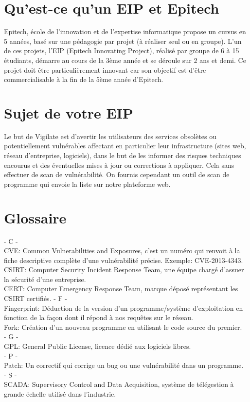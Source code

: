 \section{Qu'est-ce qu’un EIP et Epitech}
Epitech,  école de l'innovation et de l'expertise informatique propose un cursus en 5 années, basé sur une pédagogie par projet (à réaliser seul ou en groupe).  L'un de ces projets, l’EIP (Epitech Innovating Project), réalisé par groupe de 6 à 15 étudiants, démarre au cours de la 3ème année et se déroule sur 2 ans et demi. Ce  projet doit être particulièrement innovant car son objectif est d’être commercialisable à la fin de la 5ème année d’Epitech.

\section{Sujet de votre EIP}
Le but de Vigilate est d’avertir les utilisateurs des services obsolètes ou potentiellement vulnérables affectant en particulier leur infrastructure (sites web, réseau d'entreprise, logiciels), dans le but de les informer des risques techniques encourus et des éventuelles mises à jour ou corrections à appliquer.
Cela sans effectuer de scan de vulnérabilité.
On fournis cependant un outil de scan de programme qui envoie la liste sur notre plateforme web.

\section{Glossaire}
\noindent
- C -\\
CVE: Common Vulnerabilities and Exposures, c'est un numéro qui renvoit à la fiche descriptive complète d'une vulnérabilité précise. Exemple: CVE-2013-4343.\\
CSIRT: Computer Security Incident Response Team, une équipe chargé d'assuer la sécurité d'une entreprise.\\
CERT: Computer Emergency Response Team, marque déposé représentant les CSIRT certifiés.
- F -\\
Fingerprint: Déduction de la version d'un programme/système d'exploitation en fonction de la façon dont il répond à nos requêtes sur le réseau.\\
Fork: Création d'un nouveau programme en utilisant le code source du premier.\\
- G -\\
GPL: General Public License, licence dédié aux logiciels libres.\\
- P -\\
Patch: Un correctif qui corrige un bug ou une vulnérabilité dans un programme.\\
- S -\\
SCADA: Supervisory Control and Data Acquisition, système de télégestion à grande échelle utilisé dans l'industrie.\\

